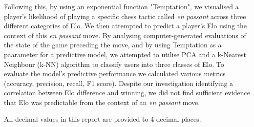 \documentclass[10pt,a4paper]{article}
\begin{document}
Following this, by using an exponential function "Temptation", we visualised a player's likelihood of playing a specific chess tactic called \textit{en passant} across three different categories of Elo. We then attempted to predict a player's Elo using the context of this \textit{en passant} move. By analysing computer-generated evaluations of the state of the game preceding the move, and by using Temptation as a paarameter for a predictive model, we attempted to utilise PCA and a k-Nearest Neighbour (k-NN) algorithm to classify users into three classes of Elo. To evaluate the model's predictive performance we calculated various metrics (accuracy, precision, recall, F1 score). Despite our investigation identifying a correlation between Elo difference and winning, we did not find sufficient evidence that Elo was predictable from the context of an \textit{en passant} move. \newline

All decimal values in this report are provided to 4 decimal places.
\end{document}
